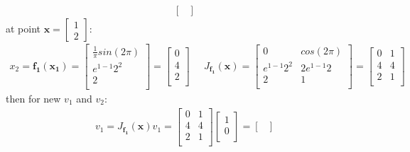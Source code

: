 \documentclass[12pt]{article}
\begin{document}
\begin{qsolve}
\begin{gather*}
\begin{bmatrix}
        \end{bmatrix}
    \end{gather*}
    at point $\mathbf{x} = \begin{bmatrix}
            1 \\
            2
        \end{bmatrix}$:
    \begin{gather*}
        x_2 = \mathbf{f_1(x_1)} = \begin{bmatrix}
            \frac{1}{\pi} sin(2 \pi) \\
            e^{1 -1}2^{2}            \\
            2                        \\
        \end{bmatrix} = \begin{bmatrix}
            0 \\
            4 \\
            2 \\
        \end{bmatrix}
        \; \; \; \; \;
        J_{\mathbf{f_1}}(\mathbf{x}) =
        \begin{bmatrix}
            0             & cos(2 \pi) \\
            e^{1 -1}2^{2} & 2e^{1 -1}2 \\
            2             & 1          \\
        \end{bmatrix}
        =
        \begin{bmatrix}
            0 & 1 \\
            4 & 4 \\
            2 & 1 \\
        \end{bmatrix}
    \end{gather*}
    then for new $v_1$ and $v_2$:
    \begin{gather*}
        v_1 = J_{\mathbf{f_1}}(\mathbf{x}) v_1 =
        \begin{bmatrix}
            0 & 1 \\
            4 & 4 \\
            2 & 1 \\
        \end{bmatrix}
        \begin{bmatrix}
            1 \\
            0 \\
        \end{bmatrix}
        =
        \begin{bmatrix}

\end{bmatrix}
\end{gather*}
\end{qsolve}
\end{document}
